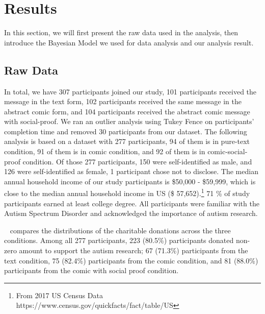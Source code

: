 \section{Results}
\label{sec:Study on Behavior Results}

In this section, we will first present the raw data used in the analysis, then introduce the Bayesian Model we used for data analysis and our analysis result.

\subsection{Raw Data}
\label{sub:Study on Behavior Raw Data}
In total, we have 307 participants joined our study, 101 participants received the message in the text form, 102 participants received the same message in the abstract comic form, and 104 participants received the abstract comic message with social-proof. We ran an outlier analysis using Tukey Fence on participants' completion time and removed 30 participants from our dataset. The following analysis is based on a dataset with 277 participants, 94 of them is in pure-text condition, 91 of them is in comic condition, and 92 of them is in comic-social-proof condition. Of those 277 participants, 150 were self-identified as male, and 126 were self-identified as female, 1 participant chose not to disclose. The median annual household income of our study participants is \$50,000 - \$59,999, which is close to the median annual household income in US (\$ 57,652).\footnote{From 2017 US Census Data https://www.census.gov/quickfacts/fact/table/US} 71 \% of study participants earned at least college degree. All participants were familiar with the Autism Spectrum Disorder and acknowledged the importance of autism research. 

~ compares the distributions of the charitable donations across the three conditions. Among all 277 participants, 223 (80.5\%) participants donated non-zero amount to support the autism research; 67 (71.3\%) participants from the text condition, 75 (82.4\%) participants from the comic condition, and 81 (88.0\%) participants from the comic with social proof condition.


